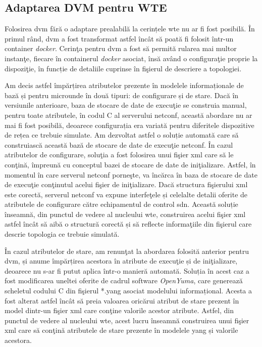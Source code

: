\subsection{Adaptarea DVM pentru WTE}

Folosirea \gls{dvm} fără o adaptare prealabilă la cerințele \gls{wte} nu ar fi fost posibilă. În primul rând, \gls{dvm} a fost transformat astfel încât să poată fi folosit într-un container \textit{docker}. Cerinţa pentru \gls{dvm} a fost să permită rularea mai multor instanţe, fiecare în containerul \textit{docker} asociat, însă având o configuraţie proprie la dispoziţie, în funcție de detaliile cuprinse în fişierul de descriere a topologiei.

Am decis astfel împărțirea atributelor prezente în modelele informaționale de bază și pentru microunde în două tipuri: de configurare și de stare. Dacă în versiunile anterioare, baza de stocare de date de execuţie se construia manual, pentru toate atributele, în codul C al serverului \gls{netconf}, această abordare nu ar mai fi fost posibilă, deoarece configurația era variată pentru diferitele dispozitive de rețea ce trebuie simulate. Am dezvoltat astfel o soluție automată care să construiască această bază de stocare de date de execuţie \gls{netconf}. În cazul atributelor de configurare, soluţia a fost folosirea unui fişier \gls{xml} care să le conţină, împreună cu conceptul bazei de stocare de date de iniţializare. Astfel, în momentul în care serverul \gls{netconf} porneşte, va încărca în baza de stocare de date de execuţie conţinutul acelui fişier de iniţializare. Dacă structura fişierului \gls{xml} este corectă, serverul \gls{netconf} va expune interfeţele și celelalte detalii oferite de atributele de configurare către echipamentul de control \gls{sdn}. Această soluție înseamnă, din punctul de vedere al nucleului \gls{wte}, construirea acelui fişier \gls{xml} astfel încât să aibă o structură corectă și să reflecte informaţiile din fişierul care descrie topologia ce trebuie simulată.

În cazul atributelor de stare, am renunţat la abordarea folosită anterior pentru \gls{dvm}, și anume împărțirea acestora în atribute de execuţie și de iniţializare, deoarece nu s-ar fi putut aplica într-o manieră automată. Soluția în acest caz a fost modificarea uneltei oferite de cadrul software \textit{OpenYuma}, care generează scheletul codului C din fişierul *.yang asociat modelului informațional. Acesta a fost alterat astfel încât să preia valoarea oricărui atribut de stare prezent în model dintr-un fişier \gls{xml} care conţine valorile acestor atribute. Astfel, din punctul de vedere al nucleului \gls{wte}, acest lucru înseamnă construirea unui fişier \gls{xml} care să conţină atributele de stare prezente în modelele \gls{yang} și valorile acestora.

